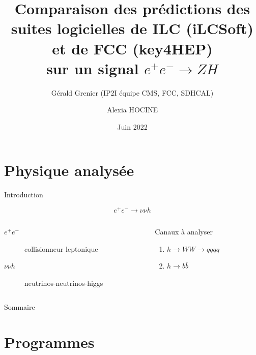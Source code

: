 \documentclass[9pt]{beamer}
\author[Hocine]{Alexia HOCINE}
\title{
	Comparaison des prédictions des suites logicielles de ILC (iLCSoft) et de FCC (key4HEP) \\
	sur un signal $ e^{+} e^{-} \longrightarrow Z H $ 
}
\subtitle{Gérald Grenier (IP2I équipe CMS, FCC, SDHCAL)}
\institute[UCBL]{Université de Claude Bernard Lyon 1}
\date[2022]{Juin 2022}
\newcommand{\bbar}{\overline{b}}
\begin{document}

\begin{frame}
	\titlepage
\end{frame}

\section{Physique analysée}

\begin{frame}{Introduction}

	$$ e^{+} e^{-} \longrightarrow \nu \nu h $$

	\begin{columns}
		
		\begin{column}{0.55\textwidth}
			\begin{description}
				\item[$e^{+} e^{-}$] collisionneur leptonique
				\item[$\nu \nu h$] neutrinos-neutrinos-higgs
			\end{description}
		\end{column}
		
		\begin{column}{0.4\textwidth}
			\begin{block}{Canaux à analyser}
				\begin{enumerate}
					\item $h \longrightarrow WW \longrightarrow qqqq$
					\item $h \longrightarrow b\bbar$
				\end{enumerate}
			\end{block}
		\end{column}
	\end{columns}

\end{frame}


\begin{frame}{Sommaire}
	\tableofcontents
\end{frame}

\section{Programmes}
\end{document}

